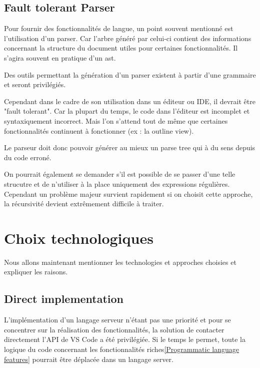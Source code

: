 \documentclass[
    iict, %
    il, %
]{heig-tb}
\begin{document}
\subsection{Fault tolerant Parser}
Pour fournir des fonctionnalités de langue, un point souvent mentionné est l'utilisation d'un parser.
Car l'arbre généré par celui-ci contient des informations concernant la structure du document utiles pour certaines fonctionnalités.
Il s'agira souvent en pratique d'un \Gls{ast}.

Des outils permettant la génération d'un parser existent à partir d'une grammaire et seront privilégiés.

Cependant dans le cadre de son utilisation dans un éditeur ou IDE, il devrait être "fault tolerant".
Car la plupart du temps, le code dans l'éditeur est incomplet et syntaxiquement incorrect.
Mais l'on s'attend tout de même que certaines fonctionnalités continuent à fonctionner (ex : la outline view).

Le parseur doit donc pouvoir générer au mieux un parse tree qui à du sens depuis du code erroné.

On pourrait également se demander s'il est possible de se passer d'une telle strucutre et de n'utiliser à la place uniquement des expressions régulières.
Cependant un problème majeur survient rapidement si on choisit cette approche, la récursivité devient extrêmement difficile à traiter. \cite{antlr-mega-tutorial}


\section{Choix technologiques}
Nous allons maintenant mentionner les technologies et approches choisies et expliquer les raisons.

\subsection{Direct implementation}
L'implémentation d'un langage serveur n'étant pas une priorité et pour se concentrer sur la réalisation des fonctionnalités, la solution de contacter directement l'API de VS Code a été privilégiée.
Si le temps le permet, toute la logique du code concernant les fonctionnalités riches\ref{Programmatic language features} pourrait être déplacée dans un langage server.
\end{document}
